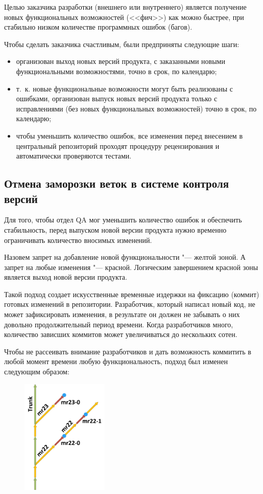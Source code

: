 \documentclass[10pt, a5paper]{article}
\begin{document}
Целью заказчика разработки (внешнего или внутреннего) является получение новых функциональных возможностей (<<фич>>) как можно быстрее, при стабильно низком количестве программных ошибок (багов).

Чтобы сделать заказчика счастливым, были предприняты следующие шаги:

\begin{itemize}
  \item организован выход новых версий продукта, с заказанными новыми функциональными возможностями, точно в срок, по календарю;
  \item т.~к. новые функциональные возможности могут быть реализованы с ошибками, организован выпуск новых версий продукта только с исправлениями (без новых функциональных возможностей) точно в срок, по календарю;
  \item чтобы уменьшить количество ошибок, все изменения перед внесением в центральный репозиторий проходят процедуру рецензирования и автоматически проверяются тестами.
\end{itemize}

\subsection*{Отмена заморозки веток в системе контроля версий}

Для того, чтобы отдел QA мог уменьшить количество ошибок и обеспечить стабильность, перед выпуском новой версии продукта нужно временно ограничивать количество вносимых изменений.

Назовем запрет на добавление новой функциональности "--- желтой зоной. А запрет на любые изменения "--- красной. Логическим завершением красной зоны является выход новой версии продукта.

Такой подход создает искусственные временные издержки на фиксацию (коммит)  готовых изменений в репозитории. Разработчик, который написал новый код, не может зафиксировать изменения, в результате он должен не забывать о них довольно продолжительный период времени. Когда разработчиков много, количество зависших коммитов может увеличиваться до нескольких сотен.

Чтобы не рассеивать внимание разработчиков и дать возможность коммитить в любой момент времени любую функциональность, подход был изменен следующим образом:

\begin{figure}
  \centering
  \includegraphics[height=5.5cm]{05_zones_old.png}
\end{figure}
\end{document}
